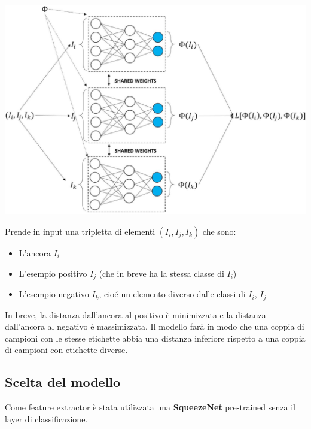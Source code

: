 \documentclass[11pt]{article}
\begin{document}
\begin{center}
    \begin{minipage}{0.5\linewidth}
    \includegraphics[width=\linewidth]{02.png}
    \end{minipage}
\end{center}


Prende in input una tripletta di elementi $(I_i, I_j, I_k)$ che sono:

\begin{itemize}
    \item L'ancora $I_i$ 
    \item L'esempio positivo $I_j$ (che in breve ha la stessa classe di $I_i$)
    \item L'esempio negativo $I_k$, cioé un elemento diverso dalle classi di $I_i$, $I_j$
\end{itemize}

In breve, la distanza dall'ancora al positivo è minimizzata e
la distanza dall'ancora al negativo è massimizzata.
Il modello farà in modo che una coppia di
campioni con le stesse etichette abbia una distanza inferiore
rispetto a una coppia di campioni con etichette diverse.

\subsection{Scelta del modello}

Come feature extractor è stata utilizzata
una \textbf{SqueezeNet} pre-trained senza il layer di classificazione.
\end{document}
